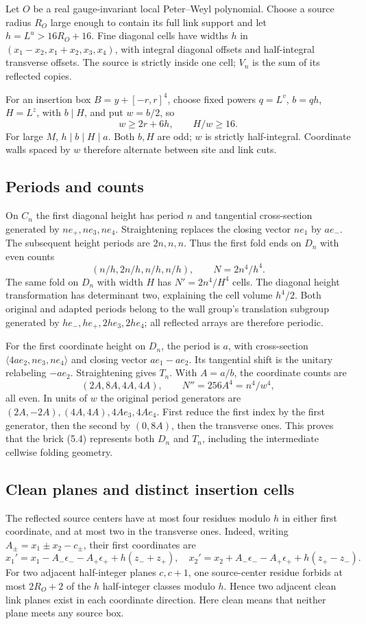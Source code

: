 \documentclass[11pt]{article}
\theoremstyle{remark}
\begin{document}
Let $O$ be a real gauge-invariant local Peter--Weyl polynomial.
Choose a source radius $R_O$ large enough to contain its full link
support and let $h=L^u>16R_O+16$. Fine diagonal cells have widths $h$
in $(x_1-x_2,x_1+x_2,x_3,x_4)$, with integral diagonal offsets
and half-integral transverse offsets. The source is strictly inside
one cell; $V_n$ is the sum of its reflected copies.

For an insertion box $B=y+[-r,r]^4$, choose fixed powers
$q=L^v$, $b=qh$, $H=L^z$, with $b\mid H$, and put $w=b/2$, so
\[
 w\ge2r+6h,\qquad H/w\ge16.
 \tag{5.2}
\]
For large $M$, $h\mid b\mid H\mid a$.
Both $b,H$ are odd; $w$ is strictly half-integral. Coordinate
walls spaced by $w$ therefore alternate between site and link cuts.

\subsection{Periods and counts}
On $C_n$ the first diagonal height has period $n$ and tangential
cross-section generated by $ne_+,ne_3,ne_4$. Straightening replaces
the closing vector $ne_1$ by $ae_-$. The subsequent height periods
are $2n,n,n$. Thus the first fold ends on $D_n$ with even counts
\[
 (n/h,2n/h,n/h,n/h),\qquad N=2n^4/h^4.
 \tag{5.3}
\]
The same fold on $D_n$ with width $H$ has
$N'=2n^4/H^4$ cells. The diagonal height transformation has
determinant two, explaining the cell volume $h^4/2$.
Both original and adapted periods belong to the wall group's
translation subgroup generated by $he_-,he_+,2he_3,2he_4$;
all reflected arrays are therefore periodic.

For the first coordinate height on $D_n$, the period is $a$, with
cross-section $\langle4ae_2,ne_3,ne_4\rangle$ and closing vector
$ae_1-ae_2$. Its tangential shift is the unitary relabeling $-ae_2$.
Straightening gives $T_n$. With $A=a/b$, the coordinate counts are
\[
 (2A,8A,4A,4A),\qquad N''=256A^4=n^4/w^4,
 \tag{5.4}
\]
all even. In units of $w$ the original period generators are
$(2A,-2A),(4A,4A),4Ae_3,4Ae_4$. First reduce the first index by
the first generator, then the second by $(0,8A)$, then the transverse
ones. This proves that the brick (5.4) represents both $D_n$ and
$T_n$, including the intermediate cellwise folding geometry.

\subsection{Clean planes and distinct insertion cells}
The reflected source centers have at most four residues modulo $h$
in either first coordinate, and at most two in the transverse ones.
Indeed, writing $A_\pm=x_1\pm x_2-c_\pm$, their first coordinates
are
\[
 x_1'=x_1-A_-\epsilon_--A_+\epsilon_++h(z_-+z_+),\quad
 x_2'=x_2+A_-\epsilon_--A_+\epsilon_++h(z_+-z_-).
 \tag{5.5}
\]
For two adjacent half-integer planes $c,c+1$, one source-center
residue forbids at most $2R_O+2$ of the $h$ half-integer classes
modulo $h$. Hence two adjacent clean link planes exist in each
coordinate direction. Here clean means that neither plane meets
any source box.
\end{document}
